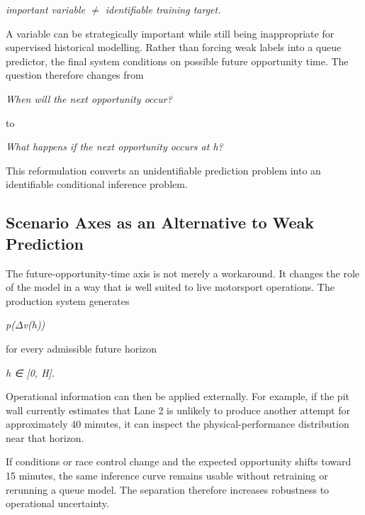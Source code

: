 \begin{center}\textit{important variable \ensuremath{\neq} identifiable training target.}\end{center}

A variable can be strategically important while still being inappropriate for supervised historical modelling. Rather than forcing weak labels into a queue predictor, the final system conditions on possible future opportunity time. The question therefore changes from

\begin{center}\textit{When will the next opportunity occur?}\end{center}

to

\begin{center}\textit{What happens if the next opportunity occurs at h?}\end{center}

This reformulation converts an unidentifiable prediction problem into an identifiable conditional inference problem.

\subsection{Scenario Axes as an Alternative to Weak Prediction}
The future-opportunity-time axis is not merely a workaround. It changes the role of the model in a way that is well suited to live motorsport operations. The production system generates

\begin{center}\textit{p(\ensuremath{\Delta}v(h))}\end{center}

for every admissible future horizon

\begin{center}\textit{h ∈ [0, H].}\end{center}

Operational information can then be applied externally. For example, if the pit wall currently estimates that Lane 2 is unlikely to produce another attempt for approximately 40 minutes, it can inspect the physical-performance distribution near that horizon.

If conditions or race control change and the expected opportunity shifts toward 15 minutes, the same inference curve remains usable without retraining or rerunning a queue model. The separation therefore increases robustness to operational uncertainty.

